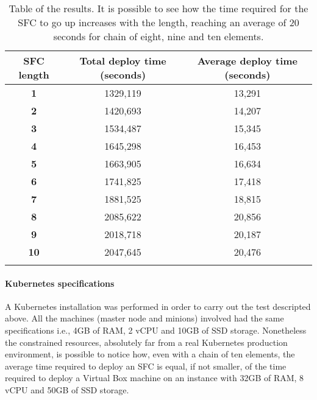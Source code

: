 \begin{longtable}[c]{c|c|c}
\textbf{SFC length} & \textbf{Total deploy time (seconds)} & \textbf{Average deploy time (seconds)} \\ \hline
\endhead
%
\textbf{1}          & 1329,119                   & 13,291                       \\
\textbf{2}          & 1420,693                   & 14,207                       \\
\textbf{3}          & 1534,487                   & 15,345                       \\
\textbf{4}          & 1645,298                   & 16,453                       \\
\textbf{5}          & 1663,905                   & 16,634                       \\
\textbf{6}          & 1741,825                   & 17,418                       \\
\textbf{7}          & 1881,525                   & 18,815                       \\
\textbf{8}          & 2085,622                   & 20,856                       \\
\textbf{9}          & 2018,718                   & 20,187                       \\
\textbf{10}         & 2047,645                   & 20,476                       \\
\caption[SFC start up time]{Table of the results. It is possible to see how the
  time required for the SFC to go up increases with the length, reaching an
  average of 20 seconds for chain of eight, nine and ten elements.}
\label{chap:tests:sec:sfclength:tab:sfcdata}\\
\end{longtable}

\newpage

\paragraph*{Kubernetes specifications}
A Kubernetes installation was performed in order to carry out the test
descripted above. All the machines (master node and minions) involved had the
same specifications i.e., 4GB of RAM, 2 vCPU and 10GB of SSD storage.
Nonetheless the constrained resources, absolutely far from a real Kubernetes
production environment, is possible to notice how, even with a chain of ten
elements, the average time required to deploy an SFC is equal, if not smaller,
of the time required to deploy a Virtual Box machine on an instance with 32GB of
RAM, 8 vCPU and 50GB of SSD storage.


